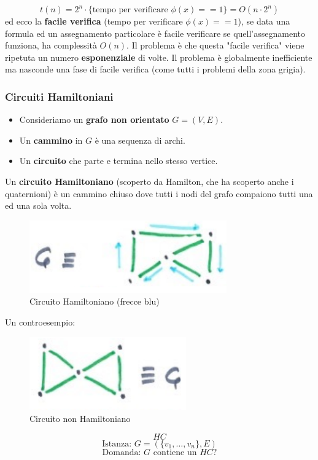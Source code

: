 \documentclass{article}
\begin{document}
$$t(n)=2^n\cdot \{\text{tempo per verificare }\phi(x)==1\} = O(n\cdot 2^n)$$
ed ecco la \textbf{facile verifica} (tempo per verificare $\phi (x)==1$), se data una formula ed un assegnamento particolare
è facile verificare se quell'assegnamento funziona, ha complessità $O(n)$. Il problema
è che questa "facile verifica" viene ripetuta un numero \textbf{esponenziale} di volte. Il problema
è globalmente inefficiente ma nasconde una fase di facile verifica (come tutti i problemi
della zona grigia).

\subsubsection{Circuiti Hamiltoniani}
\begin{itemize}
    \item Consideriamo un \textbf{grafo non orientato} $G=(V,E)$.
    \item Un \textbf{cammino} in $G$ è una sequenza di archi.
    \item Un \textbf{circuito} che parte e termina nello stesso vertice.
\end{itemize}
Un \textbf{circuito Hamiltoniano} (scoperto da Hamilton, che ha scoperto anche i quaternioni) è un
cammino chiuso dove tutti i nodi del grafo compaiono tutti una ed una sola volta.
\begin{figure}[H]
    \centering
    \includegraphics[scale=0.6]{images/hamiltonian_circuit.png}
    \caption{Circuito Hamiltoniano (frecce blu)}
\end{figure}
Un controesempio:
\begin{figure}[H]
    \centering
    \includegraphics[scale=0.6]{images/non_hamiltonian.png}
    \caption{Circuito non Hamiltoniano}
\end{figure}
$$HC$$
$$\text{Istanza: }G=(\{v_1,\dots,v_n\},E)$$
$$\text{Domanda: }G \text{ contiene un }HC?$$
\end{document}

